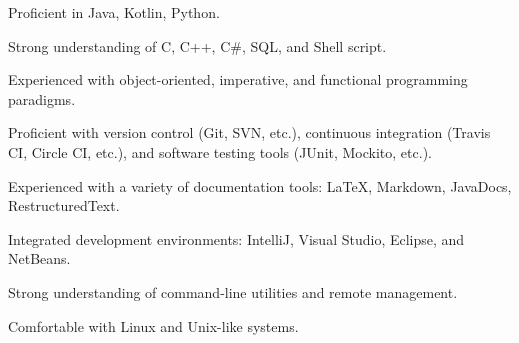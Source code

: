 
\begin{cvskills}
    {
      \begin{cvitems}
        \item {Proficient in Java, Kotlin, Python.}
        \item {Strong understanding of C, C++, C\#, SQL, and Shell script.}
        \item {Experienced with object-oriented, imperative, and functional programming paradigms.}
      \end{cvitems}
    }

  {
    \begin{cvitems}
      \item {Proficient with version control (Git, SVN, etc.), continuous integration (Travis CI, Circle CI, etc.), and software testing tools (JUnit, Mockito, etc.).}
      \item {Experienced with a variety of documentation tools: LaTeX, Markdown, JavaDocs, RestructuredText.}
    \end{cvitems}
  }

    {
      \begin{cvitems}
        \item {Integrated development environments: IntelliJ, Visual Studio, Eclipse, and NetBeans.}
        \item {Strong understanding of command-line utilities and remote management.}
        \item {Comfortable with Linux and Unix-like systems.}
      \end{cvitems}
    }

\end{cvskills}
